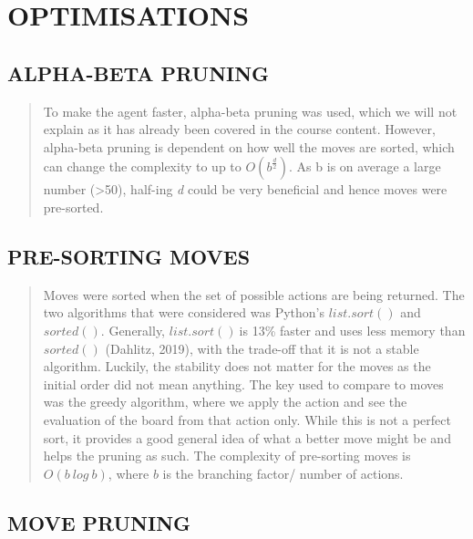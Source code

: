 \documentclass[
]{article}
\begin{document}
\hypertarget{optimisations}{%
\section{OPTIMISATIONS}\label{optimisations}}

\hypertarget{alpha-beta-pruning}{%
\subsection{ALPHA-BETA PRUNING}\label{alpha-beta-pruning}}

\begin{quote}
To make the agent faster, alpha-beta pruning was used, which we will not
explain as it has already been covered in the course content. However,
alpha-beta pruning is dependent on how well the moves are sorted, which
can change the complexity to up to \(O(b^{\frac{d}{2}})\text{.\ }\)As b
is on average a large number (\textgreater50), half-ing \emph{d} could
be very beneficial and hence moves were pre-sorted.
\end{quote}

\hypertarget{pre-sorting-moves}{%
\subsection{PRE-SORTING MOVES}\label{pre-sorting-moves}}

\begin{quote}
Moves were sorted when the set of possible actions are being returned.
The two algorithms that were considered was Python's \(list.sort()\) and
\(sorted().\) Generally, \(list.sort()\ \)is 13\% faster and uses less
memory than \(sorted()\) (Dahlitz, 2019), with the trade-off that it is
not a stable algorithm. Luckily, the stability does not matter for the
moves as the initial order did not mean anything. The key used to
compare to moves was the greedy algorithm, where we apply the action and
see the evaluation of the board from that action only. While this is not
a perfect sort, it provides a good general idea of what a better move
might be and helps the pruning as such. The complexity of pre-sorting
moves is \(O(b\ log\ b)\), where \(b\) is the branching factor/ number
of actions.
\end{quote}

\hypertarget{move-pruning}{%
\subsection{MOVE PRUNING}\label{move-pruning}}
\end{document}
